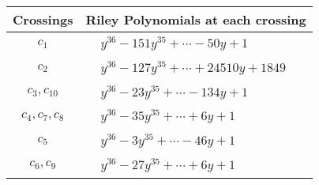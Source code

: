 \documentclass[1p]{elsarticle_modified}
\theoremstyle{definition}
\begin{document}
\begin{tabular}{m{50pt}|m{274pt}}
Crossings & \hspace{64pt}Riley Polynomials at each crossing \\
\hline $$\begin{aligned}c_{1}\end{aligned}$$&$\begin{aligned}
&y^{36}-151 y^{35}+\cdots-50 y+1
\end{aligned}$\\
\hline $$\begin{aligned}c_{2}\end{aligned}$$&$\begin{aligned}
&y^{36}-127 y^{35}+\cdots+24510 y+1849
\end{aligned}$\\
\hline $$\begin{aligned}c_{3},c_{10}\end{aligned}$$&$\begin{aligned}
&y^{36}-23 y^{35}+\cdots-134 y+1
\end{aligned}$\\
\hline $$\begin{aligned}c_{4},c_{7},c_{8}\end{aligned}$$&$\begin{aligned}
&y^{36}-35 y^{35}+\cdots+6 y+1
\end{aligned}$\\
\hline $$\begin{aligned}c_{5}\end{aligned}$$&$\begin{aligned}
&y^{36}-3 y^{35}+\cdots-46 y+1
\end{aligned}$\\
\hline $$\begin{aligned}c_{6},c_{9}\end{aligned}$$&$\begin{aligned}
&y^{36}-27 y^{35}+\cdots+6 y+1
\end{aligned}$\\
\hline
\end{tabular}
\vskip 2pc
\end{document}

